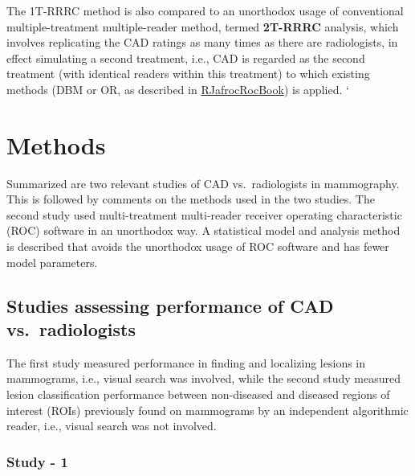 \documentclass[
]{book}
\begin{document}
The 1T-RRRC method is also compared to an unorthodox usage of conventional multiple-treatment multiple-reader method, termed \textbf{2T-RRRC} analysis, which involves replicating the CAD ratings as many times as there are radiologists, in effect simulating a second treatment, i.e., CAD is regarded as the second treatment (with identical readers within this treatment) to which existing methods (DBM or OR, as described in \href{https://dpc10ster.github.io/RJafrocRocBook/dbm-analysis-significance-testing.html}{RJafrocRocBook}) is applied.
`

\hypertarget{standalone-cad-radiologists-methods}{%
\section{Methods}\label{standalone-cad-radiologists-methods}}

Summarized are two relevant studies of CAD vs.~radiologists in mammography. This is followed by comments on the methods used in the two studies. The second study used multi-treatment multi-reader receiver operating characteristic (ROC) software in an unorthodox way. A statistical model and analysis method is described that avoids the unorthodox usage of ROC software and has fewer model parameters.

\hypertarget{standalone-cad-radiologists-two-previous-studies}{%
\subsection{Studies assessing performance of CAD vs.~radiologists}\label{standalone-cad-radiologists-two-previous-studies}}

The first study \citep{hupse2013standalone} measured performance in finding and localizing lesions in mammograms, i.e., visual search was involved, while the second study \citep{kooi2016comparison} measured lesion classification performance between non-diseased and diseased regions of interest (ROIs) previously found on mammograms by an independent algorithmic reader, i.e., visual search was not involved.

\hypertarget{standalone-cad-radiologists-study1}{%
\subsubsection{Study - 1}\label{standalone-cad-radiologists-study1}}
\end{document}
